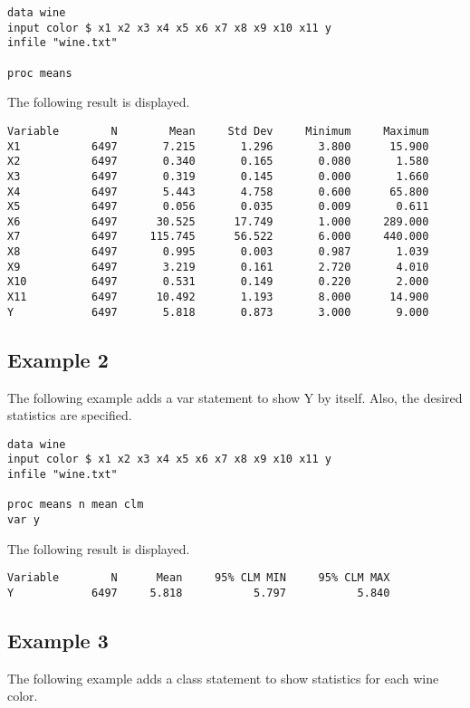 \documentclass[11pt]{article}
\begin{document}
\begin{Verbatim}
data wine
input color $ x1 x2 x3 x4 x5 x6 x7 x8 x9 x10 x11 y
infile "wine.txt"

proc means
\end{Verbatim}

The following result is displayed.

\begin{Verbatim}
Variable        N        Mean     Std Dev     Minimum     Maximum
X1           6497       7.215       1.296       3.800      15.900
X2           6497       0.340       0.165       0.080       1.580
X3           6497       0.319       0.145       0.000       1.660
X4           6497       5.443       4.758       0.600      65.800
X5           6497       0.056       0.035       0.009       0.611
X6           6497      30.525      17.749       1.000     289.000
X7           6497     115.745      56.522       6.000     440.000
X8           6497       0.995       0.003       0.987       1.039
X9           6497       3.219       0.161       2.720       4.010
X10          6497       0.531       0.149       0.220       2.000
X11          6497      10.492       1.193       8.000      14.900
Y            6497       5.818       0.873       3.000       9.000
\end{Verbatim}

\subsection*{Example 2}
The following example adds a var statement to show Y by itself.
Also, the desired statistics are specified.

\begin{Verbatim}
data wine
input color $ x1 x2 x3 x4 x5 x6 x7 x8 x9 x10 x11 y
infile "wine.txt"

proc means n mean clm
var y
\end{Verbatim}

The following result is displayed.

\begin{Verbatim}
Variable        N      Mean     95% CLM MIN     95% CLM MAX
Y            6497     5.818           5.797           5.840
\end{Verbatim}

\subsection*{Example 3}
The following example adds a class statement
to show statistics for each wine color.
\end{document}
